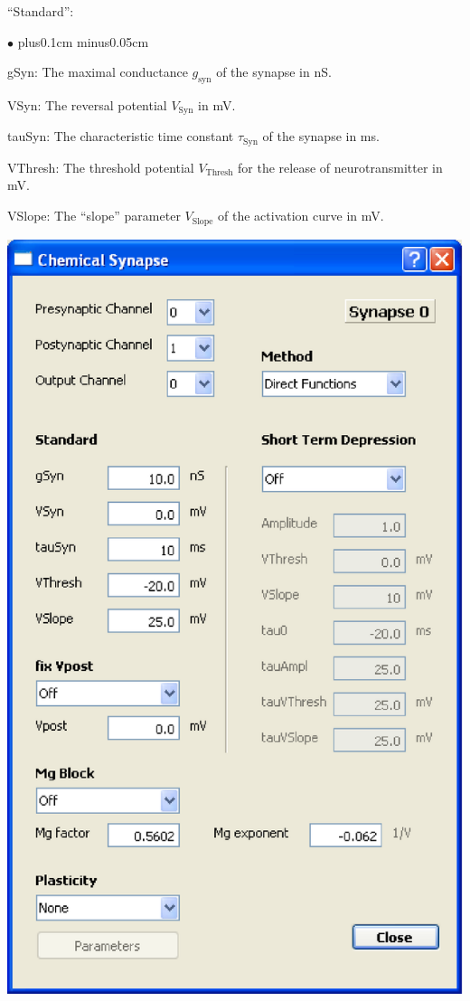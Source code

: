 \documentclass{article}
\newenvironment{myitem}{\begin{list}{$\bullet$}{\setlength{\leftmargin}{1.1em}
\itemsep0.1cm plus0.1cm minus0.05cm
\listparindent0cm
\addtolength{\labelsep}{0.5\labelsep}
\setlength{\labelwidth}{0.8em}
\setlength{\leftmargin}{\labelwidth}
\addtolength{\leftmargin}{\labelsep}
}}{\end{list}}
\begin{document}
``Standard'':
\begin{myitem}
  \item gSyn: The maximal conductance $g_{\text{syn}}$ of the synapse in nS. 
  \item VSyn: The reversal potential $V_{\text{Syn}}$ in mV. 
\item tauSyn: The characteristic time constant $\tau_{\text{Syn}}$ of
  the synapse in ms.  
\item VThresh: The threshold  potential $V_{\text{Thresh}}$ for the
  release of neurotransmitter in mV.  
\item VSlope: The ``slope'' parameter $V_{\text{Slope}}$ of the
  activation curve in mV.  
  \end{myitem}
                                                          
\noindent
\parbox[b]{0.48\textwidth}{
  \includegraphics[scale=0.5]{chemicalDialog}
}
\end{document}
